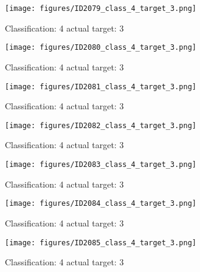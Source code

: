 \begin{figure}[h!]
\begin{center}
\texttt{[image: figures/ID2079\_class\_4\_target\_3.png]}
\end{center}
\caption{ Classification: 4 actual target: 3}
\label{fig:ID2079_class_4_target_3}
\end{figure}
\begin{figure}[h!]
\begin{center}
\texttt{[image: figures/ID2080\_class\_4\_target\_3.png]}
\end{center}
\caption{ Classification: 4 actual target: 3}
\label{fig:ID2080_class_4_target_3}
\end{figure}
\begin{figure}[h!]
\begin{center}
\texttt{[image: figures/ID2081\_class\_4\_target\_3.png]}
\end{center}
\caption{ Classification: 4 actual target: 3}
\label{fig:ID2081_class_4_target_3}
\end{figure}
\begin{figure}[h!]
\begin{center}
\texttt{[image: figures/ID2082\_class\_4\_target\_3.png]}
\end{center}
\caption{ Classification: 4 actual target: 3}
\label{fig:ID2082_class_4_target_3}
\end{figure}
\begin{figure}[h!]
\begin{center}
\texttt{[image: figures/ID2083\_class\_4\_target\_3.png]}
\end{center}
\caption{ Classification: 4 actual target: 3}
\label{fig:ID2083_class_4_target_3}
\end{figure}
\begin{figure}[h!]
\begin{center}
\texttt{[image: figures/ID2084\_class\_4\_target\_3.png]}
\end{center}
\caption{ Classification: 4 actual target: 3}
\label{fig:ID2084_class_4_target_3}
\end{figure}
\begin{figure}[h!]
\begin{center}
\texttt{[image: figures/ID2085\_class\_4\_target\_3.png]}
\end{center}
\caption{ Classification: 4 actual target: 3}
\label{fig:ID2085_class_4_target_3}
\end{figure}
